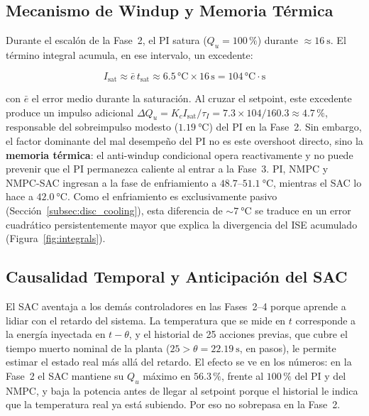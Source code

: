 \documentclass[processes,article,submit,moreauthors,pdftex]{Definitions/mdpi}
\newcommand{\Qu}{Q_u}
\begin{document}
\subsection{Mecanismo de Windup y Memoria Térmica}
\label{subsec:disc_windup}

Durante el escalón de la Fase~2, el PI satura ($\Qu = 100\,\%$) durante
$\approx\!\SI{16}{\second}$. El término integral acumula, en ese intervalo,
un excedente:

\begin{equation}
  \label{eq:windup_analysis}
  I_{\mathrm{sat}} \approx \bar{e}\, t_{\mathrm{sat}}
  \approx 6.5\,\text{°C} \times 16\,\text{s} = 104\,\text{°C}\cdot\text{s}
\end{equation}

con $\bar{e}$ el error medio durante la saturación. Al cruzar el setpoint,
este excedente produce un impulso adicional
$\Delta\Qu = K_c I_{\mathrm{sat}}/\tau_I = 7.3 \times 104/160.3 \approx
4.7\,\%$, responsable del sobreimpulso modesto ($\SI{1.19}{\celsius}$) del
PI en la Fase~2. Sin embargo, el factor dominante del mal desempeño del PI no es
este overshoot directo, sino la \textbf{memoria térmica}: el anti-windup
condicional opera reactivamente y no puede prevenir que el PI permanezca
caliente al entrar a la Fase~3. PI, NMPC y NMPC-SAC ingresan a la fase de
enfriamiento a $48.7$--$\SI{51.1}{\celsius}$, mientras el SAC lo hace a
$\SI{42.0}{\celsius}$. Como el enfriamiento es exclusivamente pasivo
(Sección~\ref{subsec:disc_cooling}), esta diferencia de $\sim\!\SI{7}{\celsius}$
se traduce en un error cuadrático persistentemente mayor que explica la
divergencia del ISE acumulado (Figura~\ref{fig:integrals}).

\subsection{Causalidad Temporal y Anticipación del SAC}
\label{subsec:disc_causal}

El SAC aventaja a los demás controladores en las Fases~2--4 porque aprende a
lidiar con el retardo del sistema. La temperatura que se mide en $t$
corresponde a la energía inyectada en $t - \theta$, y el historial de 25
acciones previas, que cubre el tiempo muerto nominal de la planta
($25 > \theta = \SI{22.19}{\second}$, en pasos), le permite estimar el estado
real más allá del retardo. El efecto se ve en los números: en la Fase~2 el SAC
mantiene su $\Qu$ máximo en $56.3\,\%$, frente al $100\,\%$ del PI y del NMPC,
y baja la potencia antes de llegar al setpoint porque el historial le indica
que la temperatura real ya está subiendo. Por eso no sobrepasa en la Fase~2.
\end{document}
